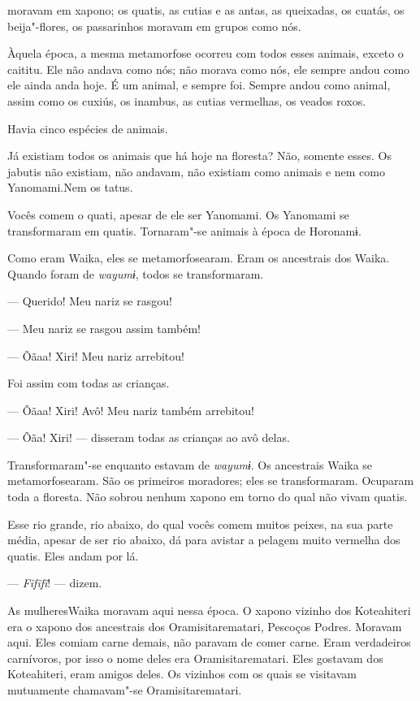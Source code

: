  

 moravam em xapono; os quatis, as cutias e as antas, as
queixadas, os cuatás, os beija"-flores, os passarinhos moravam em grupos
como nós.

Àquela época, a mesma metamorfose ocorreu com todos esses animais,
exceto o caititu. Ele não andava como nós; não morava como nós, ele
sempre andou como ele ainda anda hoje. É um animal, e sempre foi. Sempre
andou como animal, assim como os cuxiús, os inambus, as cutias
vermelhas, os veados roxos.

Havia cinco espécies de animais. 

Já existiam todos os animais que há hoje na floresta? Não, somente
esses. Os jabutis não existiam, não andavam, não existiam como animais e
nem como Yanomami.Nem os tatus. 

Vocês comem o quati, apesar de ele ser Yanomami. Os Yanomami se
transformaram em quatis. Tornaram"-se animais à época de Horonamɨ. 

Como eram Waika, eles se metamorfosearam. Eram os ancestrais dos Waika.
Quando foram de \emph{wayumɨ}, todos se transformaram. 

--- Querido! Meu nariz se rasgou! 

--- Meu nariz se rasgou assim também!

--- Õãaa! Xiri! Meu nariz arrebitou! 

Foi assim com todas as crianças. 

--- Õãaa! Xiri! Avô! Meu nariz também arrebitou! 

--- Õãa! Xiri! --- disseram todas as crianças ao avô delas. 

Transformaram"-se enquanto estavam de \emph{wayumɨ}. Os ancestrais Waika
se metamorfosearam. São os primeiros moradores; eles se transformaram.
Ocuparam toda a floresta. Não sobrou nenhum xapono em torno do qual não
vivam quatis. 

Esse rio grande, rio abaixo, do qual vocês comem muitos peixes, na sua
parte média, apesar de ser rio abaixo, dá para avistar a pelagem muito
vermelha dos quatis. Eles andam por lá. 

--- \emph{Fĩfĩfĩ}! --- dizem. 

As mulheresWaika moravam aqui nessa época. O xapono vizinho
dos Koteahiteri era o xapono dos ancestrais dos Oramisitarematari,
Pescoços Podres. Moravam aqui. Eles comiam carne demais, não paravam de
comer carne. Eram verdadeiros carnívoros, por isso o nome deles era
Oramisitarematari. Eles gostavam dos Koteahiteri, eram amigos deles. Os
vizinhos com os quais se visitavam mutuamente chamavam"-se
Oramisitarematari. 

